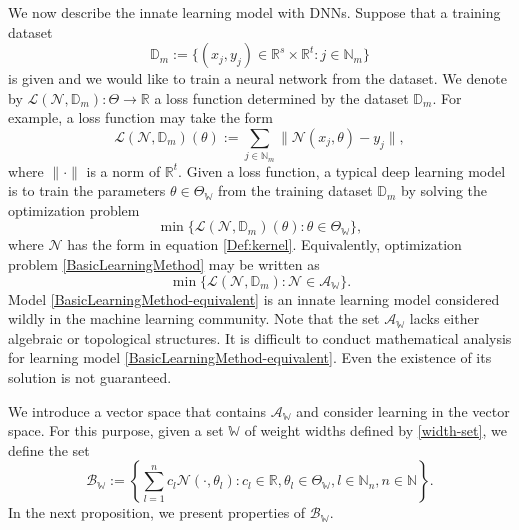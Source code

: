 \documentclass[11pt]{article}
\begin{document}
We now describe the innate learning model with DNNs.
Suppose that a training dataset 
\begin{equation}\label{Dataset}
\mathbb{D}_m:=  \{(x_j,y_j) \in\mathbb{R}^s\times\mathbb{R}^t:j\in\mathbb{N}_m\}
\end{equation}
is given and we would like to train a neural network from the dataset. We denote by $\mathcal{L}(\mathcal{N},\mathbb{D}_m): \Theta\to \mathbb{R}$ a loss function determined by the dataset $\mathbb{D}_m$. For example, a loss function may take the form
$$
\mathcal{L}(\mathcal{N},\mathbb{D}_m)(\theta):=\sum_{j\in\mathbb{N}_m}\|\mathcal{N}(x_j,\theta)-y_j\|,
$$
where $\|\cdot\|$ is a norm of $\mathbb{R}^t$.
Given a loss function, a typical deep learning model is to train the parameters $\theta\in \Theta_\mathbb{W}$ from the training dataset $\mathbb{D}_m$ by solving the optimization problem 
\begin{equation}\label{BasicLearningMethod}
    \min\{\mathcal{L}(\mathcal{N},\mathbb{D}_m)(\theta): \theta\in\Theta_\mathbb{W}\},
\end{equation}
where $\mathcal{N}$ has the form in equation \eqref{Def:kernel}. Equivalently, optimization problem \eqref{BasicLearningMethod} may be written as
\begin{equation}\label{BasicLearningMethod-equivalent}
    \min\{\mathcal{L}(\mathcal{N},\mathbb{D}_m): \mathcal{N}\in\mathcal{A}_{\mathbb{W}}\}.
\end{equation}
Model \eqref{BasicLearningMethod-equivalent} is an innate learning model considered wildly in the machine learning community.
Note that the set $\mathcal{A}_{\mathbb{W}}$ lacks either algebraic or topological structures.
It is difficult to conduct mathematical analysis for learning model \eqref{BasicLearningMethod-equivalent}. Even the existence of its solution is not guaranteed.  

We introduce a vector space that contains  $\mathcal{A}_{\mathbb{W}}$ and consider learning in the vector space. 
For this purpose, given a set $\mathbb{W}$  of weight widths defined by \eqref{width-set}, we define the set
\begin{equation}\label{space B Delta}
\mathcal{B}_{\mathbb{W}}:=\left\{ \sum_{l=1}^n c_l\mathcal{N}(\cdot,\theta_l): c_l\in\mathbb{R}, \theta_l\in \Theta_{\mathbb{W}}, l\in \mathbb{N}_n, n\in \mathbb{N}\right\}.
\end{equation}
In the next proposition, we present properties of $\mathcal{B}_{\mathbb{W}}$.
\end{document}

